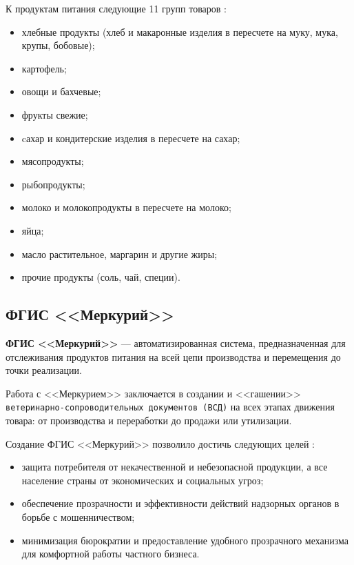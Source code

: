 \clearpage

К продуктам питания следующие 11 групп товаров \cite{info_consumer_basket2}:

\begin{itemize}[label=--]
	\item хлебные продукты (хлеб и макаронные изделия в пересчете на муку, мука, крупы, бобовые);
	\item картофель;
	\item овощи и бахчевые;
	\item фрукты свежие;
	\item cахар и кондитерские изделия в пересчете на сахар;
	\item мясопродукты;
	\item рыбопродукты;
	\item молоко и молокопродукты в пересчете на молоко;
	\item яйца;
	\item масло растительное, маргарин и другие жиры;
	\item прочие продукты (соль, чай, специи).
\end{itemize}

\subsection{ФГИС <<Меркурий>>}

\textbf{ФГИС <<Меркурий>>} --- автоматизированная система, предназначенная для отслеживания продуктов питания на всей цепи производства и перемещения до точки реализации.

Работа с <<Меркурием>> заключается в создании и <<гашении>> \texttt{ветеринарно-сопроводительных документов (ВСД)} на всех этапах движения товара: от производства и переработки до продажи или утилизации.

\clearpage

Создание ФГИС <<Меркурий>> позволило достичь следующих целей \cite{info_mercury, info_mercury2}:

\begin{itemize}[label=--]
	\item защита потребителя от некачественной и небезопасной продукции, а все население страны от экономических и социальных угроз;
	\item обеспечение прозрачности и эффективности действий надзорных органов в борьбе с мошенничеством;
	\item минимизация бюрократии и предоставление удобного прозрачного механизма для комфортной работы частного бизнеса.
\end{itemize}


